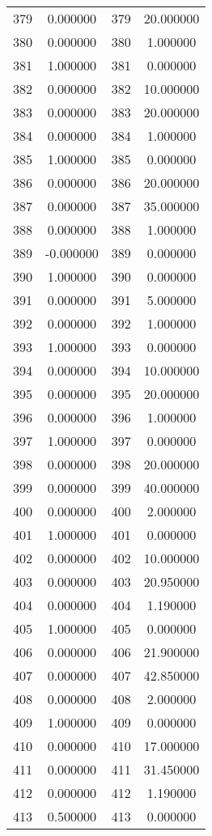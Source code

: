 \documentclass[12pt]{article}
\begin{document}
\begin{longtable}{@{}cccc@{}}
379 & 0.000000 & 379 & 20.000000 \\
380 & 0.000000 & 380 & 1.000000 \\
381 & 1.000000 & 381 & 0.000000 \\
382 & 0.000000 & 382 & 10.000000 \\
383 & 0.000000 & 383 & 20.000000 \\
384 & 0.000000 & 384 & 1.000000 \\
385 & 1.000000 & 385 & 0.000000 \\
386 & 0.000000 & 386 & 20.000000 \\
387 & 0.000000 & 387 & 35.000000 \\
388 & 0.000000 & 388 & 1.000000 \\
389 & -0.000000 & 389 & 0.000000 \\
390 & 1.000000 & 390 & 0.000000 \\
391 & 0.000000 & 391 & 5.000000 \\
392 & 0.000000 & 392 & 1.000000 \\
393 & 1.000000 & 393 & 0.000000 \\
394 & 0.000000 & 394 & 10.000000 \\
395 & 0.000000 & 395 & 20.000000 \\
396 & 0.000000 & 396 & 1.000000 \\
397 & 1.000000 & 397 & 0.000000 \\
398 & 0.000000 & 398 & 20.000000 \\
399 & 0.000000 & 399 & 40.000000 \\
400 & 0.000000 & 400 & 2.000000 \\
401 & 1.000000 & 401 & 0.000000 \\
402 & 0.000000 & 402 & 10.000000 \\
403 & 0.000000 & 403 & 20.950000 \\
404 & 0.000000 & 404 & 1.190000 \\
405 & 1.000000 & 405 & 0.000000 \\
406 & 0.000000 & 406 & 21.900000 \\
407 & 0.000000 & 407 & 42.850000 \\
408 & 0.000000 & 408 & 2.000000 \\
409 & 1.000000 & 409 & 0.000000 \\
410 & 0.000000 & 410 & 17.000000 \\
411 & 0.000000 & 411 & 31.450000 \\
412 & 0.000000 & 412 & 1.190000 \\
413 & 0.500000 & 413 & 0.000000 \\

\end{longtable}
\end{document}
